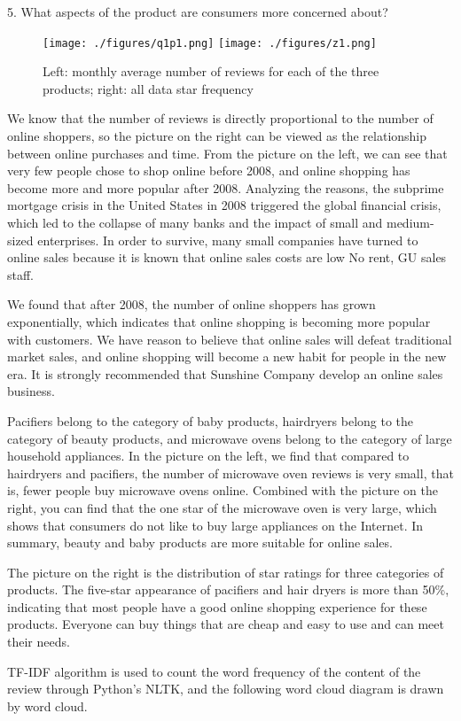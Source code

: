 \documentclass[UTF8]{article}
\begin{document}
5. What aspects of the product are consumers more concerned about?

\begin{figure}[h]
	\texttt{[image: ./figures/q1p1.png]}
	\texttt{[image: ./figures/z1.png]}
	\caption{Left: monthly average number of reviews for each of the three products; right: all data star frequency} \label{z1_q1p1}
\end{figure}

We know that the number of reviews is directly proportional to the number of online shoppers, so the picture on the right can be viewed as the relationship between online purchases and time. From the picture on the left, we can see that very few people chose to shop online before 2008, and online shopping has become more and more popular after 2008. Analyzing the reasons, the subprime mortgage crisis in the United States in 2008 triggered the global financial crisis, which led to the collapse of many banks and the impact of small and medium-sized enterprises. In order to survive, many small companies have turned to online sales because it is known that online sales costs are low No rent, GU sales staff.

We found that after 2008, the number of online shoppers has grown exponentially, which indicates that online shopping is becoming more popular with customers. We have reason to believe that online sales will defeat traditional market sales, and online shopping will become a new habit for people in the new era. It is strongly recommended that Sunshine Company develop an online sales business.

Pacifiers belong to the category of baby products, hairdryers belong to the category of beauty products, and microwave ovens belong to the category of large household appliances. In the picture on the left, we find that compared to hairdryers and pacifiers, the number of microwave oven reviews is very small, that is, fewer people buy microwave ovens online. Combined with the picture on the right, you can find that the one star of the microwave oven is very large, which shows that consumers do not like to buy large appliances on the Internet. In summary, beauty and baby products are more suitable for online sales.

The picture on the right is the distribution of star ratings for three categories of products. The five-star appearance of pacifiers and hair dryers is more than 50\%, indicating that most people have a good online shopping experience for these products. Everyone can buy things that are cheap and easy to use and can meet their needs.

TF-IDF algorithm is used to count the word frequency of the content of the review through Python's NLTK, and the following word cloud diagram is drawn by word cloud.
\end{document}
